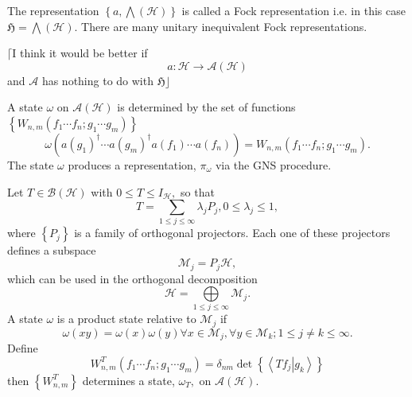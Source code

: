 \documentclass[aps,preprint]{revtex4}%
\begin{document}
The representation $\left\{  a,%
{\displaystyle\bigwedge}
\left(  \mathcal{H}\right)  \right\}  $ is called a Fock representation i.e.
in this case $\mathfrak{H=}%
{\displaystyle\bigwedge}
\left(  \mathcal{H}\right)  $. There are many unitary inequivalent Fock representations.

$\lceil$I think it would be better if
\begin{equation}
a:\mathcal{H}\rightarrow\mathcal{A}\left(  \mathcal{H}\right)
\end{equation}
and $\mathcal{A}$ has nothing to do with $\mathfrak{H\rfloor}$

A state $\omega$ on $\mathcal{A}\left(  \mathcal{H}\right)  $ is determined by
the set of functions $\left\{  W_{n,m}\left(  f_{1}\cdots f_{n};g_{1}\cdots
g_{m}\right)  \right\}  $
\begin{equation}
\omega\left(  a\left(  g_{1}\right)  ^{\dagger}\cdots a\left(  g_{m}\right)
^{\dagger}a\left(  f_{1}\right)  \cdots a\left(  f_{n}\right)  \right)
=W_{n,m}\left(  f_{1}\cdots f_{n};g_{1}\cdots g_{m}\right)  .
\end{equation}
The state $\omega$ produces a representation, $\pi_{\omega}$ via the GNS procedure.

Let $T\in\mathcal{B}\left(  \mathcal{H}\right)  $ with $0\leq T\leq
I_{\mathcal{H}},$ so that
\begin{equation}
T=\sum_{1\leq j\leq\infty}\lambda_{j}P_{j},0\leq\lambda_{j}\leq1,
\end{equation}
where $\left\{  P_{j}\right\}  $ is a family of orthogonal projectors. Each
one of these projectors defines a subspace
\begin{equation}
\mathcal{M}_{j}=P_{j}\mathcal{H},
\end{equation}
which can be used in the orthogonal decomposition
\begin{equation}
\mathcal{H}=%
{\displaystyle\bigoplus\limits_{1\leq j\leq\infty}}
\mathcal{M}_{j}.
\end{equation}
A state $\omega$ is a product state relative to $\mathcal{M}_{j}$ if
\begin{equation}
\omega\left(  xy\right)  =\omega\left(  x\right)  \omega\left(  y\right)
\forall x\in\mathcal{M}_{j},\forall y\in\mathcal{M}_{k};1\leq j\neq
k\leq\infty.
\end{equation}
Define
\begin{equation}
W_{n,m}^{T}\left(  f_{1}\cdots f_{n};g_{1}\cdots g_{m}\right)  =\delta
_{nm}\det\left\{  \left\langle \left.  Tf_{j}\right\vert g_{k}\right\rangle
\right\}
\end{equation}
then $\left\{  W_{n,m}^{T}\right\}  $ determines a state, $\omega_{T},$ on
$\mathcal{A}\left(  \mathcal{H}\right)  .$
\end{document}
